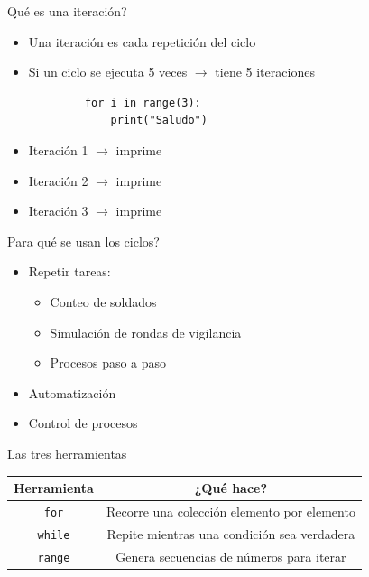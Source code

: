 \documentclass{beamer}
\begin{document}
    \begin{frame}[fragile,t]{Qué es una iteración?}
        \begin{itemize}
            \item Una iteración es cada repetición del ciclo
            \item Si un ciclo se ejecuta 5 veces $\rightarrow$ tiene 5 iteraciones
        \end{itemize}
        \begin{verbatim}
            for i in range(3):
                print("Saludo")
        \end{verbatim}
        \begin{itemize}
            \item Iteración 1 $\rightarrow$ imprime
            \item Iteración 2 $\rightarrow$ imprime
            \item Iteración 3 $\rightarrow$ imprime
        \end{itemize}
    \end{frame}

    \begin{frame}{Para qué se usan los ciclos?}
        \begin{itemize}
            \item Repetir tareas:
            \begin{itemize}
                \item Conteo de soldados
                \item Simulación de rondas de vigilancia
                \item Procesos paso a paso
            \end{itemize}
            \item Automatización
            \item Control de procesos
        \end{itemize}
    \end{frame}

    \begin{frame}{Las tres herramientas}
        \centering
        \begin{tabular}{|c|c|}
            \hline
            Herramienta & ¿Qué hace? \\
            \hline
            \texttt{for} & Recorre una colección elemento por elemento \\
            \hline
            \texttt{while} & Repite mientras una condición sea verdadera \\
            \hline
            \texttt{range} & Genera secuencias de números para iterar \\
            \hline
        \end{tabular}
    \end{frame}
\end{document}

